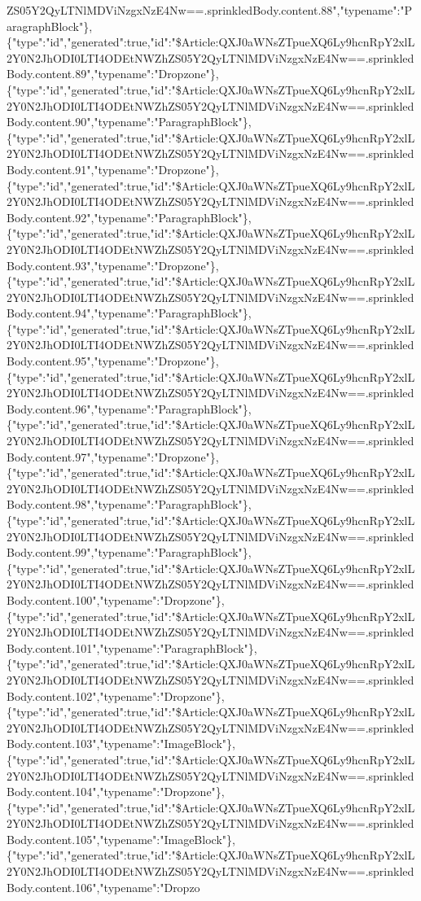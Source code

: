 ZS05Y2QyLTNlMDViNzgxNzE4Nw==.sprinkledBody.content.88","typename":"ParagraphBlock"\},\{"type":"id","generated":true,"id":"\$Article:QXJ0aWNsZTpueXQ6Ly9hcnRpY2xlL2Y0N2JhODI0LTI4ODEtNWZhZS05Y2QyLTNlMDViNzgxNzE4Nw==.sprinkledBody.content.89","typename":"Dropzone"\},\{"type":"id","generated":true,"id":"\$Article:QXJ0aWNsZTpueXQ6Ly9hcnRpY2xlL2Y0N2JhODI0LTI4ODEtNWZhZS05Y2QyLTNlMDViNzgxNzE4Nw==.sprinkledBody.content.90","typename":"ParagraphBlock"\},\{"type":"id","generated":true,"id":"\$Article:QXJ0aWNsZTpueXQ6Ly9hcnRpY2xlL2Y0N2JhODI0LTI4ODEtNWZhZS05Y2QyLTNlMDViNzgxNzE4Nw==.sprinkledBody.content.91","typename":"Dropzone"\},\{"type":"id","generated":true,"id":"\$Article:QXJ0aWNsZTpueXQ6Ly9hcnRpY2xlL2Y0N2JhODI0LTI4ODEtNWZhZS05Y2QyLTNlMDViNzgxNzE4Nw==.sprinkledBody.content.92","typename":"ParagraphBlock"\},\{"type":"id","generated":true,"id":"\$Article:QXJ0aWNsZTpueXQ6Ly9hcnRpY2xlL2Y0N2JhODI0LTI4ODEtNWZhZS05Y2QyLTNlMDViNzgxNzE4Nw==.sprinkledBody.content.93","typename":"Dropzone"\},\{"type":"id","generated":true,"id":"\$Article:QXJ0aWNsZTpueXQ6Ly9hcnRpY2xlL2Y0N2JhODI0LTI4ODEtNWZhZS05Y2QyLTNlMDViNzgxNzE4Nw==.sprinkledBody.content.94","typename":"ParagraphBlock"\},\{"type":"id","generated":true,"id":"\$Article:QXJ0aWNsZTpueXQ6Ly9hcnRpY2xlL2Y0N2JhODI0LTI4ODEtNWZhZS05Y2QyLTNlMDViNzgxNzE4Nw==.sprinkledBody.content.95","typename":"Dropzone"\},\{"type":"id","generated":true,"id":"\$Article:QXJ0aWNsZTpueXQ6Ly9hcnRpY2xlL2Y0N2JhODI0LTI4ODEtNWZhZS05Y2QyLTNlMDViNzgxNzE4Nw==.sprinkledBody.content.96","typename":"ParagraphBlock"\},\{"type":"id","generated":true,"id":"\$Article:QXJ0aWNsZTpueXQ6Ly9hcnRpY2xlL2Y0N2JhODI0LTI4ODEtNWZhZS05Y2QyLTNlMDViNzgxNzE4Nw==.sprinkledBody.content.97","typename":"Dropzone"\},\{"type":"id","generated":true,"id":"\$Article:QXJ0aWNsZTpueXQ6Ly9hcnRpY2xlL2Y0N2JhODI0LTI4ODEtNWZhZS05Y2QyLTNlMDViNzgxNzE4Nw==.sprinkledBody.content.98","typename":"ParagraphBlock"\},\{"type":"id","generated":true,"id":"\$Article:QXJ0aWNsZTpueXQ6Ly9hcnRpY2xlL2Y0N2JhODI0LTI4ODEtNWZhZS05Y2QyLTNlMDViNzgxNzE4Nw==.sprinkledBody.content.99","typename":"ParagraphBlock"\},\{"type":"id","generated":true,"id":"\$Article:QXJ0aWNsZTpueXQ6Ly9hcnRpY2xlL2Y0N2JhODI0LTI4ODEtNWZhZS05Y2QyLTNlMDViNzgxNzE4Nw==.sprinkledBody.content.100","typename":"Dropzone"\},\{"type":"id","generated":true,"id":"\$Article:QXJ0aWNsZTpueXQ6Ly9hcnRpY2xlL2Y0N2JhODI0LTI4ODEtNWZhZS05Y2QyLTNlMDViNzgxNzE4Nw==.sprinkledBody.content.101","typename":"ParagraphBlock"\},\{"type":"id","generated":true,"id":"\$Article:QXJ0aWNsZTpueXQ6Ly9hcnRpY2xlL2Y0N2JhODI0LTI4ODEtNWZhZS05Y2QyLTNlMDViNzgxNzE4Nw==.sprinkledBody.content.102","typename":"Dropzone"\},\{"type":"id","generated":true,"id":"\$Article:QXJ0aWNsZTpueXQ6Ly9hcnRpY2xlL2Y0N2JhODI0LTI4ODEtNWZhZS05Y2QyLTNlMDViNzgxNzE4Nw==.sprinkledBody.content.103","typename":"ImageBlock"\},\{"type":"id","generated":true,"id":"\$Article:QXJ0aWNsZTpueXQ6Ly9hcnRpY2xlL2Y0N2JhODI0LTI4ODEtNWZhZS05Y2QyLTNlMDViNzgxNzE4Nw==.sprinkledBody.content.104","typename":"Dropzone"\},\{"type":"id","generated":true,"id":"\$Article:QXJ0aWNsZTpueXQ6Ly9hcnRpY2xlL2Y0N2JhODI0LTI4ODEtNWZhZS05Y2QyLTNlMDViNzgxNzE4Nw==.sprinkledBody.content.105","typename":"ImageBlock"\},\{"type":"id","generated":true,"id":"\$Article:QXJ0aWNsZTpueXQ6Ly9hcnRpY2xlL2Y0N2JhODI0LTI4ODEtNWZhZS05Y2QyLTNlMDViNzgxNzE4Nw==.sprinkledBody.content.106","typename":"Dropzo